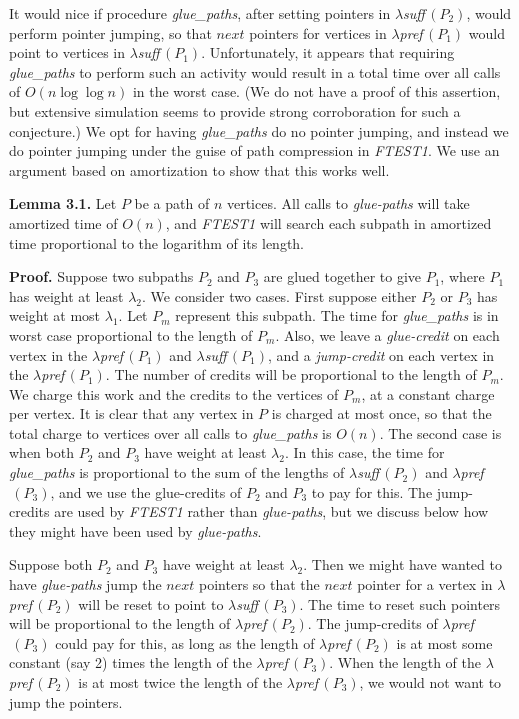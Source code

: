 {{{\dspace

It would nice if procedure {\it glue\_paths},
after setting pointers in $\lambda${\it suff}$\,(P_2)$,
would perform pointer jumping,
so that $next$ pointers for vertices in $\lambda${\it pref}$\,(P_1)$
would point to vertices in $\lambda${\it suff}$\,(P_1)$.
Unfortunately, it appears that requiring {\it glue\_paths}
to perform such an activity would result in a total time
over all calls of $O(n \log \log n)$ in the worst case.
(We do not have a proof of this assertion,
but extensive simulation seems to provide strong corroboration
for such a conjecture.)
We opt for having {\it glue\_paths} do no pointer jumping,
and instead we do pointer jumping under the guise of path
compression in {\it FTEST1}.
We use an argument based on amortization to show that this works well.
\bigskip

\noindent
{\bf Lemma 3.1.}
Let $P$ be a path of $n$ vertices.
All calls to {\it glue-paths} will take amortized time of $O(n)$,
and {\it FTEST1} will search each subpath 
in amortized time proportional to the logarithm of its length.

\noindent
{\bf Proof.}
Suppose two subpaths $P_2$ and $P_3$ are glued together to give $P_1$,
where $P_1$ has weight at least $\lambda_2$.
We consider two cases.
First suppose either $P_2$ or $P_3$ has weight at most $\lambda_1$.
Let $P_m$ represent this subpath.
The time for {\it glue\_paths} is in worst case proportional
to the length of $P_m$.
Also, we leave a {\it glue-credit}
on each vertex in the $\lambda${\it pref}$\,(P_1)$ and $\lambda${\it suff}$\,(P_1)$,
and a {\it jump-credit} on each vertex in the $\lambda${\it pref}$\,(P_1)$.
The number of credits will be proportional to the length of $P_m$.
We charge this work and the credits to the vertices of $P_m$,
at a constant charge per vertex.
It is clear that any vertex in $P$ is charged at most once,
so that the total charge to vertices over all calls to {\it glue\_paths}
is $O(n)$.
The second case is when both $P_2$ and $P_3$ have weight at least $\lambda_2$.
In this case, the time for {\it glue\_paths} is proportional to the sum
of the lengths of $\lambda${\it suff}$\,(P_2)$
and $\lambda${\it pref}$\,(P_3)$,
and we use the glue-credits of $P_2$ and $P_3$ to pay for this.
The jump-credits are used by {\it FTEST1} rather than {\it glue-paths},
but we discuss below how they might have been used by {\it glue-paths}.

Suppose both $P_2$ and $P_3$ have weight at least $\lambda_2$.
Then we might have wanted to have {\it glue-paths} jump the $next$ pointers
so that the $next$ pointer for a vertex in $\lambda${\it pref}$\,(P_2)$
will be reset to point to $\lambda${\it suff}$\,(P_3)$.
The time to reset such pointers will be proportional to the length
of $\lambda${\it pref}$\,(P_2)$.
The jump-credits of $\lambda${\it pref}$\,(P_3)$ could pay for this,
as long as the length of $\lambda${\it pref}$\,(P_2)$
is at most some constant (say 2)
times the length of the $\lambda${\it pref}$\,(P_3)$.
When the length of the $\lambda${\it pref}$\,(P_2)$
is at most twice the length of the $\lambda${\it pref}$\,(P_3)$,
we would not want to jump the pointers.

}}}
